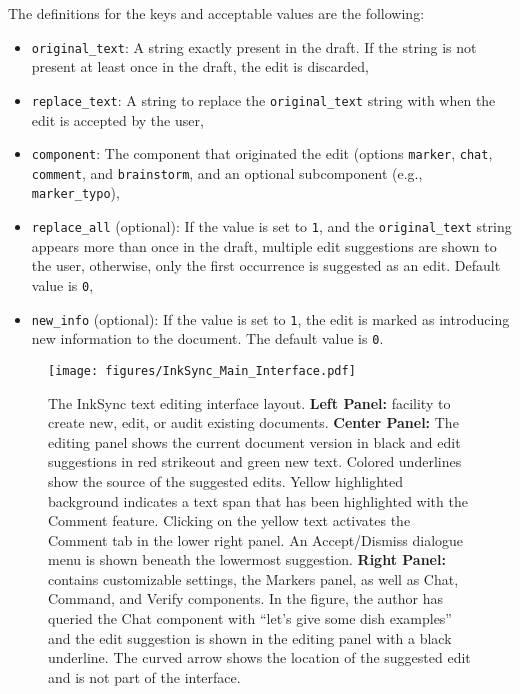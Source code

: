 \documentclass[manuscript]{acmart}
\begin{document}
The definitions for the keys and acceptable values are the following:
\begin{itemize}
    \item \texttt{original\_text}: A string exactly present in the draft. If the string is not present at least once in the draft, the edit is discarded,
    \item \texttt{replace\_text}: A string to replace the \texttt{original\_text} string with when the edit is accepted by the user,
    \item \texttt{component}: The component that originated the edit (options \texttt{marker}, \texttt{chat}, \texttt{comment}, and \texttt{brainstorm}, and an optional subcomponent (e.g., \texttt{marker\_typo}),
    \item \texttt{replace\_all} (optional): If the value is set to \texttt{1}, and the \texttt{original\_text} string appears more than once in the draft, multiple edit suggestions are shown to the user, otherwise, only the first occurrence is suggested as an edit. Default value is \texttt{0},
    \item \texttt{new\_info} (optional): If the value is set to \texttt{1}, the edit is marked as introducing new information to the document. The default value is \texttt{0}.
\end{itemize}

\begin{figure*}
    \centering
    \texttt{[image: figures/InkSync\_Main\_Interface.pdf]}
    \caption{The InkSync text editing interface layout. \textbf{Left Panel:} facility to create new, edit, or audit existing documents. \textbf{Center Panel:} The editing panel shows the current document version in black and edit suggestions in red strikeout and green new text. Colored underlines show the source of the suggested edits. Yellow highlighted background indicates a text span that has been highlighted with the Comment feature. Clicking on the yellow text activates the Comment tab in the lower right panel. An Accept/Dismiss dialogue menu is shown beneath the lowermost suggestion. \textbf{Right Panel:} contains customizable settings, the Markers panel, as well as Chat, Command, and Verify components. In the figure, the author has queried the Chat component with ``let's give some dish examples'' and the edit suggestion is shown in the editing panel with a black underline. The curved arrow shows the location of the suggested edit and is not part of the interface.}
    \label{fig:inksync_interface_main}
\end{figure*}
\end{document}

